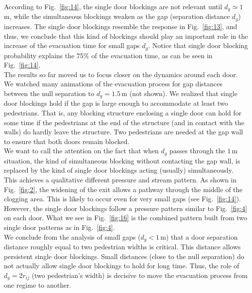 According to Fig.~\ref{fig:14}, the single door blockings are not relevant 
until $d_g\simeq1\,$m, while the simultaneous blockings weaken as the gap 
(separation distance $d_g$) increases. The single door blockings resemble the 
response in Fig.~\ref{fig:13}, and thus, we conclude that this kind of 
blockings should play an important role in the increase of the evacuation time 
for small gaps $d_g$. Notice that single door blocking probability explains the 
75\% of the evacuation time, as can be seen in Fig.~\ref{fig:14}. \\

The results so far moved us to focus closer on the dynamics around each door. 
We watched many animations of the evacuation process for gap distances between 
the null separation to $d_g=1.5\,$m (not shown). We realized that single 
door blockings hold if the gap is large enough to accommodate at least two 
pedestrians. That is, any blocking structure enclosing a single door can hold 
for some time if the pedestrians at the end of the structure (and in contact 
with the walls) do hardly leave the structure. Two pedestrians are needed at the 
gap wall to ensure that both doors remain blocked.\\ 

We want to call the attention on the fact that when $d_g$ passes through the 
$1\,$m situation, the kind of simultaneous blocking without contacting the gap 
wall, is replaced by the kind of single door blockings acting (usually) 
simultaneously. This achieves a qualitative different pressure and 
stream pattern. As shown in Fig.~\ref{fig:2}, the widening of the exit 
allows a pathway through the middle of the clogging area. This is likely to 
occur even for very small gaps (see Fig.~\ref{fig:14}). However, the single door 
blockings follow a pressure pattern similar to  Fig.~\ref{fig:4} on each door.  
What we see in Fig.~\ref{fig:16} is the combined pattern built from two 
single door patterns as in Fig.~\ref{fig:4}. \\

We conclude from the analysis of small gaps ($d_g<1\,$m) that a door 
separation distance roughly equal to two pedestrian widths is critical. 
This distance allows persistent single door blockings. Small distances (close 
to the null separation) do not actually allow single door blockings to hold for 
long time. Thus, the role of $d_g=2r_{ij}$ (two pedestrian's width) is decisive to move the evacuation 
process from one regime to another. \\ 


